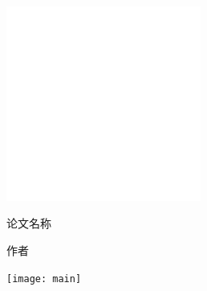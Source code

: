 \documentclass[UTF8, zihao = -4]{ctexart}
\newlength{\colpad}
\newcommand{\colwidth}{0.99\ccwd}
\newcommand{\miniwidth}{210mm}
\newcommand{\logowidth}{64mm}
\newcommand{\vertmargin}{\fill}
\begin{document}
\centering
\begin{minipage}[b][\textheight][b]{\miniwidth}
	\vspace*{\fill}\par
	\centerline{\includegraphics[width = \logowidth]{white.png}}\par
	\vspace*{\fill}\par
\end{minipage}
\hspace{\colpad}
\begin{minipage}[b][\textheight][b]{\colwidth}
	\bfseries\linespread{1}\selectfont
	\vspace*{\vertmargin}\par
	论文名称\par\vfill
	作者\par{}\par	%
	\vspace*{\vertmargin}\par
\end{minipage}
\hspace{\colpad}
\begin{minipage}[b][\textheight][b]{\miniwidth}
	\texttt{[image: main]}
\end{minipage}
\end{document}
